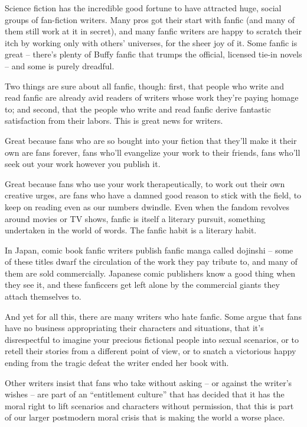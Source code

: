 Science fiction has the incredible good fortune to have attracted
huge, social groups of fan-fiction writers. Many pros got their
start with fanfic (and many of them still work at it in secret),
and many fanfic writers are happy to scratch their itch by working
only with others' universes, for the sheer joy of it. Some fanfic
is great -- there's plenty of Buffy fanfic that trumps the
official, licensed tie-in novels -- and some is purely dreadful.

Two things are sure about all fanfic, though: first, that people
who write and read fanfic are already avid readers of writers whose
work they're paying homage to; and second, that the people who
write and read fanfic derive fantastic satisfaction from their
labors. This is great news for writers.

Great because fans who are so bought into your fiction that they'll
make it their own are fans forever, fans who'll evangelize your
work to their friends, fans who'll seek out your work however you
publish it.

Great because fans who use your work therapeutically, to work out
their own creative urges, are fans who have a damned good reason to
stick with the field, to keep on reading even as our numbers
dwindle. Even when the fandom revolves around movies or TV shows,
fanfic is itself a literary pursuit, something undertaken in the
world of words. The fanfic habit is a literary habit.

In Japan, comic book fanfic writers publish fanfic manga called
dojinshi -- some of these titles dwarf the circulation of the work
they pay tribute to, and many of them are sold commercially.
Japanese comic publishers know a good thing when they see it, and
these fanficcers get left alone by the commercial giants they
attach themselves to.

And yet for all this, there are many writers who hate fanfic. Some
argue that fans have no business appropriating their characters and
situations, that it's disrespectful to imagine your precious
fictional people into sexual scenarios, or to retell their stories
from a different point of view, or to snatch a victorious happy
ending from the tragic defeat the writer ended her book with.

Other writers insist that fans who take without asking -- or
against the writer's wishes -- are part of an ``entitlement culture''
that has decided that it has the moral right to lift scenarios and
characters without permission, that this is part of our larger
postmodern moral crisis that is making the world a worse place.

